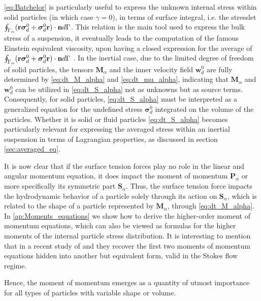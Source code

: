 \ref{eq:Batchelor} is particularly useful to express the unknown internal stress within solid particles (in which case $\gamma = 0$), in terms of surface integral, i.e. the stresslet $\oint_{\Gamma_{\alpha}} (\textbf{r}\bm\sigma_d^0+ \bm\sigma_d^0\textbf{r})\cdot \textbf{n} d\Gamma$.
This relation is the main tool used to express the bulk stress of a suspension, it eventually leads to the computation of the famous Einstein equivalent viscosity, upon having a closed expression for the average of $\oint_{\Gamma_{\alpha}} (\textbf{r}\bm\sigma_d^0+ \bm\sigma_d^0\textbf{r})\cdot \textbf{n} d\Gamma$ \citep{guazzelli2011}. 
In the inertial case, due to the limited degree of freedom of solid particles, the tensors $\textbf{M}_\alpha$ and the inner velocity field $\textbf{w}_d^0$ are fully determined by \ref{eq:dt_M_alpha} and \ref{eq:dt_mu_alpha}, indicating that $\textbf{M}_\alpha$ and $\textbf{w}_d^0$ can be utilized in \ref{eq:dt_S_alpha} not as unknowns but as source terms. 
Consequently, for solid particles, \ref{eq:dt_S_alpha} must be interpreted as a generalized equation for the undefined stress $\bm\sigma_d^0$ integrated on the volume of the particles.
Whether it is solid or fluid particles \ref{eq:dt_S_alpha} becomes particularly relevant for expressing the averaged stress within an inertial suspension in terms of Lagrangian properties, as discussed in section \ref{sec:averaged_eq}.

It is now clear that if the surface tension forces play no role in the linear and angular momentum equation, it does impact the moment of momentum $\textbf{P}_\alpha$ or more specifically its symmetric part $\textbf{S}_\alpha$.
Thus, the surface tension force impacts the hydrodynamic behavior of a particle solely through its action on $\textbf{S}_\alpha$, which is related to the shape of a particle represented by $\textbf{M}_\alpha$, through \ref{eq:dt_M_alpha}.
In \ref{ap:Moments_equations} we show how to derive the higher-order moment of momentum equations, which can also be viewed as formulas for the higher moments of the internal particle stress distribution. 
It is interesting to mention that in a recent study of \citet{dolata2021faxen} and \citet{zhou2020lamb} they recover the first two moments of momentum equations hidden into another but equivalent form, valid in the Stokes flow regime. 

Hence, the moment of momentum emerges as a quantity of utmost importance for all types of particles with variable shape or volume. 

